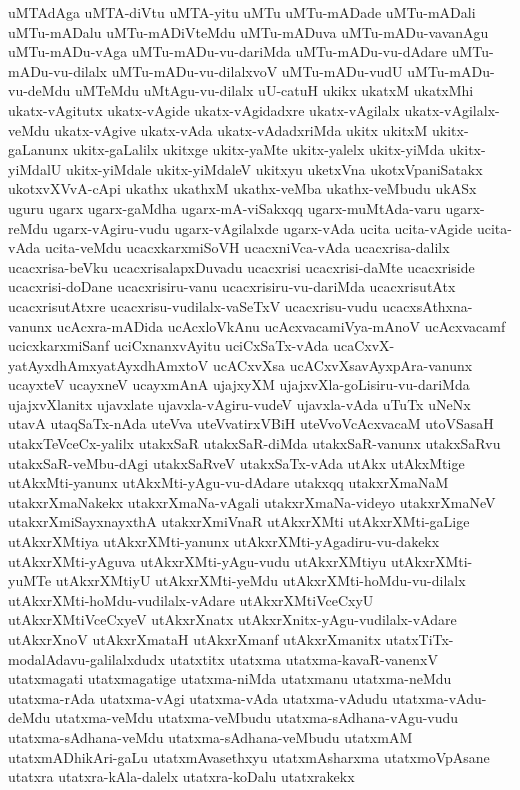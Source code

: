 {uMTAdAga
uMTA-diVtu
uMTA-yitu
uMTu
uMTu-mADade
uMTu-mADali
uMTu-mADalu
uMTu-mADiVteMdu
uMTu-mADuva
uMTu-mADu-vavanAgu
uMTu-mADu-vAga
uMTu-mADu-vu-dariMda
uMTu-mADu-vu-dAdare
uMTu-mADu-vu-dilalx
uMTu-mADu-vu-dilalxvoV
uMTu-mADu-vudU
uMTu-mADu-vu-deMdu
uMTeMdu
uMtAgu-vu-dilalx
uU-catuH
ukikx
ukatxM
ukatxMhi
ukatx-vAgitutx
ukatx-vAgide
ukatx-vAgidadxre
ukatx-vAgilalx
ukatx-vAgilalx-veMdu
ukatx-vAgive
ukatx-vAda
ukatx-vAdadxriMda
ukitx
ukitxM
ukitx-gaLanunx
ukitx-gaLalilx
ukitxge
ukitx-yaMte
ukitx-yalelx
ukitx-yiMda
ukitx-yiMdalU
ukitx-yiMdale
ukitx-yiMdaleV
ukitxyu
uketxVna
ukotxVpaniSatakx
ukotxvXVvA-cApi
ukathx
ukathxM
ukathx-veMba
ukathx-veMbudu
ukASx
uguru
ugarx
ugarx-gaMdha
ugarx-mA-viSakxqq
ugarx-muMtAda-varu
ugarx-reMdu
ugarx-vAgiru-vudu
ugarx-vAgilalxde
ugarx-vAda
ucita
ucita-vAgide
ucita-vAda
ucita-veMdu
ucacxkarxmiSoVH
ucacxniVca-vAda
ucacxrisa-dalilx
ucacxrisa-beVku
ucacxrisalapxDuvadu
ucacxrisi
ucacxrisi-daMte
ucacxriside
ucacxrisi-doDane
ucacxrisiru-vanu
ucacxrisiru-vu-dariMda
ucacxrisutAtx
ucacxrisutAtxre
ucacxrisu-vudilalx-vaSeTxV
ucacxrisu-vudu
ucacxsAthxna-vanunx
ucAcxra-mADida
ucAcxloVkAnu
ucAcxvacamiVya-mAnoV
ucAcxvacamf
ucicxkarxmiSanf
uciCxnanxvAyitu
uciCxSaTx-vAda
ucaCxvX-yatAyxdhAmxyatAyxdhAmxtoV
ucACxvXsa
ucACxvXsavAyxpAra-vanunx
ucayxteV
ucayxneV
ucayxmAnA
ujajxyXM
ujajxvXla-goLisiru-vu-dariMda
ujajxvXlanitx
ujavxlate
ujavxla-vAgiru-vudeV
ujavxla-vAda
uTuTx
uNeNx
utavA
utaqSaTx-nAda
uteVva
uteVvatirxVBiH
uteVvoVcAcxvacaM
utoVSasaH
utakxTeVceCx-yalilx
utakxSaR
utakxSaR-diMda
utakxSaR-vanunx
utakxSaRvu
utakxSaR-veMbu-dAgi
utakxSaRveV
utakxSaTx-vAda
utAkx
utAkxMtige
utAkxMti-yanunx
utAkxMti-yAgu-vu-dAdare
utakxqq
utakxrXmaNaM
utakxrXmaNakekx
utakxrXmaNa-vAgali
utakxrXmaNa-videyo
utakxrXmaNeV
utakxrXmiSayxnayxthA
utakxrXmiVnaR
utAkxrXMti
utAkxrXMti-gaLige
utAkxrXMtiya
utAkxrXMti-yanunx
utAkxrXMti-yAgadiru-vu-dakekx
utAkxrXMti-yAguva
utAkxrXMti-yAgu-vudu
utAkxrXMtiyu
utAkxrXMti-yuMTe
utAkxrXMtiyU
utAkxrXMti-yeMdu
utAkxrXMti-hoMdu-vu-dilalx
utAkxrXMti-hoMdu-vudilalx-vAdare
utAkxrXMtiVceCxyU
utAkxrXMtiVceCxyeV
utAkxrXnatx
utAkxrXnitx-yAgu-vudilalx-vAdare
utAkxrXnoV
utAkxrXmataH
utAkxrXmanf
utAkxrXmanitx
utatxTiTx-modalAdavu-galilalxdudx
utatxtitx
utatxma
utatxma-kavaR-vanenxV
utatxmagati
utatxmagatige
utatxma-niMda
utatxmanu
utatxma-neMdu
utatxma-rAda
utatxma-vAgi
utatxma-vAda
utatxma-vAdudu
utatxma-vAdu-deMdu
utatxma-veMdu
utatxma-veMbudu
utatxma-sAdhana-vAgu-vudu
utatxma-sAdhana-veMdu
utatxma-sAdhana-veMbudu
utatxmAM
utatxmADhikAri-gaLu
utatxmAvasethxyu
utatxmAsharxma
utatxmoVpAsane
utatxra
utatxra-kAla-dalelx
utatxra-koDalu
utatxrakekx
}
